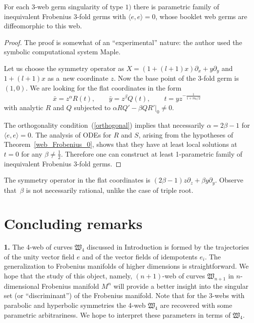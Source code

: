 \documentclass[pdftex]{sigma}
\begin{document}
\begin{proposition}
For each $3$-web germ singularity of type $1)$
there is parametric family of inequivalent Frobenius $3$-fold germs with $\langle e,e\rangle =0$, whose booklet web germs are diffeomorphic to this web.
\end{proposition}
\begin{proof} The proof is somewhat of an ``experimental'' nature: the author used the symbolic computational system Maple.

 Let us choose the symmetry operator as $X=(1+(l+1)x)\partial_x+y\partial_y$ and $1+(l+1)x$ as a~new coordinate $z$.
 Now the base point of the $3$-fold germ is $(1,0)$. We are looking for the f\/lat coordinates in the form
\[
\bar{x}=z^{\alpha}R(t), \qquad \bar{y}=z^{\beta}Q(t),\qquad t=yz^{-\frac{1}{1+m_0/2}}
\]
with analytic $R$ and $Q$ subjected to $\left.\alpha RQ'-\beta QR'\right|_0\ne 0$.

The orthogonality condition~(\ref{orthogonal}) implies that necessarily $\alpha=2\beta -1$ for $\langle e,e\rangle =0$.
The analysis of ODEs for $R$ and $S$, arising from the hypotheses of Theorem~\ref{web_Frobenius_0}, shows that they have at least local solutions at $t=0$ for any $\beta \ne \frac{1}{2}$. Therefore one can construct at least 1-parametric family of inequivalent Frobenius $3$-fold germs.
\end{proof}
\begin{remark}
The symmetry operator in the f\/lat coordinates is $(2\beta -1)z\partial_z+\beta y\partial_y$.
Observe that~$\beta$ is not necessarily rational, unlike the case of triple root.
\end{remark}

\section{Concluding remarks}

{\bf 1.} The 4-web of curves $\mathfrak{W}_4$ discussed in Introduction is formed by the trajectories of the unity vector f\/ield $e$ and of the vector f\/ields of idempotents $e_i$. The generalization to Frobenius manifolds of higher dimensions is straightforward. We hope that the study of this object, namely, $(n+1)$-web of curves $\mathfrak{W}_{n+1}$ in $n$-dimensional Frobenius manifold $M^n$ will provide a better insight into the singular set (or ``discriminant'') of the Frobenius manifold. Note that for the $3$-webs with parabolic and hyperbolic symmetries the 4-web $\mathfrak{W}_4$ are recovered with some parametric arbitrariness. We hope to interpret these parameters in terms of $\mathfrak{W}_4$.
\end{document}
